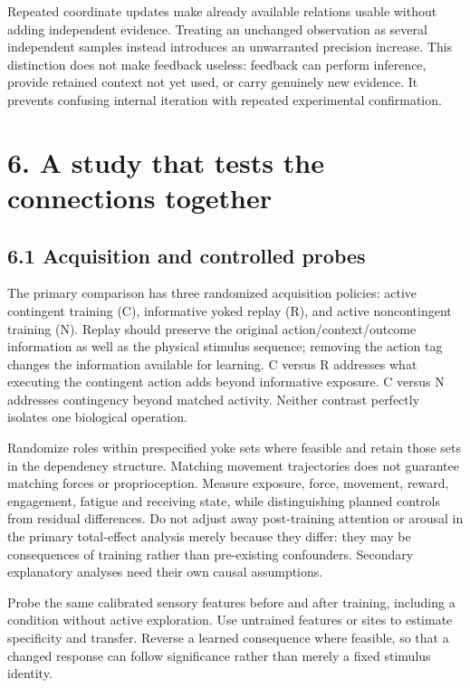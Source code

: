 \documentclass[
  american,
  11pt,
  letterpaper,
]{article}
\begin{document}
Repeated coordinate updates make already available relations usable without adding independent evidence. Treating an unchanged observation as several independent samples instead introduces an unwarranted precision increase. This distinction does not make feedback useless: feedback can perform inference, provide retained context not yet used, or carry genuinely new evidence. It prevents confusing internal iteration with repeated experimental confirmation.

\section{6. A study that tests the connections together}\label{a-study-that-tests-the-connections-together}

\subsection{6.1 Acquisition and controlled probes}\label{acquisition-and-controlled-probes}

The primary comparison has three randomized acquisition policies: active contingent training (C), informative yoked replay (R), and active noncontingent training (N). Replay should preserve the original action/context/outcome information as well as the physical stimulus sequence; removing the action tag changes the information available for learning. C versus R addresses what executing the contingent action adds beyond informative exposure. C versus N addresses contingency beyond matched activity. Neither contrast perfectly isolates one biological operation.

Randomize roles within prespecified yoke sets where feasible and retain those sets in the dependency structure. Matching movement trajectories does not guarantee matching forces or proprioception. Measure exposure, force, movement, reward, engagement, fatigue and receiving state, while distinguishing planned controls from residual differences. Do not adjust away post-training attention or arousal in the primary total-effect analysis merely because they differ: they may be consequences of training rather than pre-existing confounders. Secondary explanatory analyses need their own causal assumptions.

Probe the same calibrated sensory features before and after training, including a condition without active exploration. Use untrained features or sites to estimate specificity and transfer. Reverse a learned consequence where feasible, so that a changed response can follow significance rather than merely a fixed stimulus identity.
\end{document}
